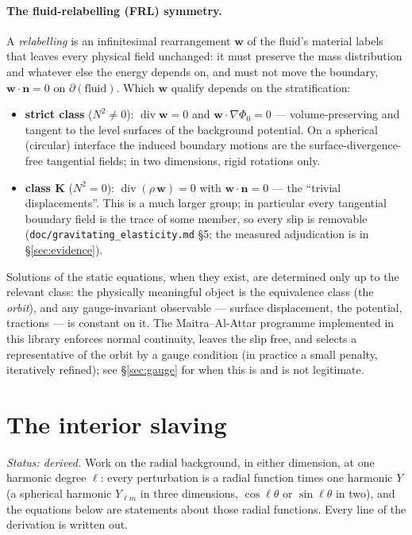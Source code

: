 \documentclass[11pt]{article}
\newcommand{\bw}{\mathbf{w}}
\newcommand{\bn}{\mathbf{n}}
\newcommand{\Div}{\operatorname{div}}
\newcommand{\code}[1]{\texttt{#1}}
\begin{document}
\paragraph{The fluid-relabelling (FRL) symmetry.} A
\emph{relabelling} is an infinitesimal rearrangement $\bw$ of the
fluid's material labels that leaves every physical field unchanged:
it must preserve the mass distribution and whatever else the energy
depends on, and must not move the boundary,
$\bw\cdot\bn = 0$ on $\partial(\text{fluid})$. Which $\bw$ qualify
depends on the stratification:
\begin{itemize}
\item \textbf{strict class} ($N^2 \ne 0$): $\Div\bw = 0$ and
  $\bw\cdot\nabla\Phi_0 = 0$ --- volume-preserving and tangent to the
  level surfaces of the background potential. On a spherical
  (circular) interface the induced boundary motions are the
  surface-divergence-free tangential fields; in two dimensions,
  rigid rotations only.
\item \textbf{class K} ($N^2 = 0$): $\Div(\rho\,\bw) = 0$ with
  $\bw\cdot\bn = 0$ --- the ``trivial displacements''. This is a much
  larger group; in particular every tangential boundary field is the
  trace of some member, so every slip is removable
  (\code{doc/gravitating\_elasticity.md} \S5; the measured
  adjudication is in \S\ref{sec:evidence}).
\end{itemize}
Solutions of the static equations, when they exist, are determined
only up to the relevant class: the physically meaningful object is
the equivalence class (the \emph{orbit}), and any gauge-invariant
observable --- surface displacement, the potential, tractions --- is
constant on it. The Maitra--Al-Attar programme implemented in this
library enforces normal continuity, leaves the slip free, and selects
a representative of the orbit by a gauge condition (in practice a
small penalty, iteratively refined); see \S\ref{sec:gauge} for when
this is and is not legitimate.

\section{The interior slaving}
\label{sec:slaving}

\emph{Status: derived.} Work on the radial background, in either
dimension, at one harmonic degree $\ell$: every perturbation is a
radial function times one harmonic $Y$ (a spherical harmonic
$Y_{\ell m}$ in three dimensions, $\cos\ell\theta$ or $\sin\ell\theta$
in two), and the equations below are statements about those radial
functions. Every line of the derivation is written out.
\end{document}
